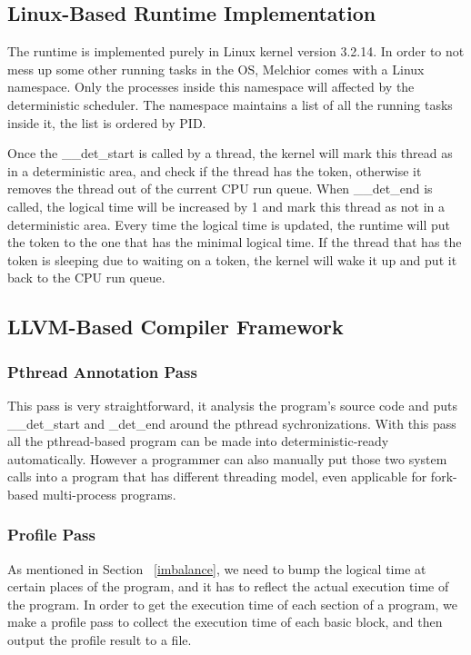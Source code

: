 \documentclass{sig-alternate}
\begin{document}
\subsection{Linux-Based Runtime Implementation}
The runtime is implemented purely in Linux kernel version 3.2.14. In order to not mess up some other running tasks in the OS, Melchior comes with a Linux namespace. Only the processes inside this namespace will affected by the deterministic scheduler. The namespace maintains a list of all the running tasks inside it, the list is ordered by PID.

Once the \_\_det\_start is called by a thread, the kernel will mark this thread as in a deterministic area, and check if the thread has the token, otherwise it removes the thread out of the current CPU run queue. When \_\_det\_end is called, the logical time will be increased by 1 and mark this thread as not in a deterministic area. Every time the logical time is updated, the runtime will put the token to the one that has the minimal logical time. If the thread that has the token is sleeping due to waiting on a token, the kernel will wake it up and put it back to the CPU run queue.

\subsection{LLVM-Based Compiler Framework}
\subsubsection{Pthread Annotation Pass}
This pass is very straightforward, it analysis the program's source code and puts \_\_det\_start and \_det\_end around the pthread sychronizations. With this pass all the pthread-based program can be made into deterministic-ready automatically. However a programmer can also manually put those two system calls into a program that has different threading model, even applicable for fork-based multi-process programs.

\subsubsection{Profile Pass}
As mentioned in Section ~\ref{imbalance}, we need to bump the logical time at certain places of the program, and it has to reflect the actual execution time of the program. In order to get the execution time of each section of a program, we make a profile pass to collect the execution time of each basic block, and then output the profile result to a file.
\end{document}
